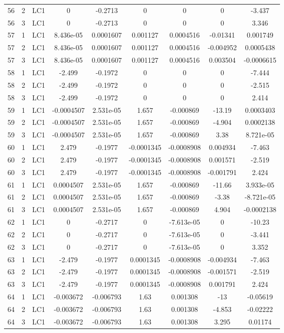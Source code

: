 \documentclass{article}%
\begin{document}
\begin{longtable}{| c c c | c c c c c c |}
56&2&LC1&0&{-}0.2713&0&0&0&{-}3.437\\%
56&3&LC1&0&{-}0.2713&0&0&0&3.346\\%
57&1&LC1&8.436e{-}05&0.0001607&0.001127&0.0004516&{-}0.01341&0.001749\\%
57&2&LC1&8.436e{-}05&0.0001607&0.001127&0.0004516&{-}0.004952&0.0005438\\%
57&3&LC1&8.436e{-}05&0.0001607&0.001127&0.0004516&0.003504&{-}0.0006615\\%
58&1&LC1&{-}2.499&{-}0.1972&0&0&0&{-}7.444\\%
58&2&LC1&{-}2.499&{-}0.1972&0&0&0&{-}2.515\\%
58&3&LC1&{-}2.499&{-}0.1972&0&0&0&2.414\\%
59&1&LC1&{-}0.0004507&2.531e{-}05&1.657&{-}0.000869&{-}13.19&0.0003403\\%
59&2&LC1&{-}0.0004507&2.531e{-}05&1.657&{-}0.000869&{-}4.904&0.0002138\\%
59&3&LC1&{-}0.0004507&2.531e{-}05&1.657&{-}0.000869&3.38&8.721e{-}05\\%
60&1&LC1&2.479&{-}0.1977&{-}0.0001345&{-}0.0008908&0.004934&{-}7.463\\%
60&2&LC1&2.479&{-}0.1977&{-}0.0001345&{-}0.0008908&0.001571&{-}2.519\\%
60&3&LC1&2.479&{-}0.1977&{-}0.0001345&{-}0.0008908&{-}0.001791&2.424\\%
61&1&LC1&0.0004507&2.531e{-}05&1.657&{-}0.000869&{-}11.66&3.933e{-}05\\%
61&2&LC1&0.0004507&2.531e{-}05&1.657&{-}0.000869&{-}3.38&{-}8.721e{-}05\\%
61&3&LC1&0.0004507&2.531e{-}05&1.657&{-}0.000869&4.904&{-}0.0002138\\%
62&1&LC1&0&{-}0.2717&0&{-}7.613e{-}05&0&{-}10.23\\%
62&2&LC1&0&{-}0.2717&0&{-}7.613e{-}05&0&{-}3.441\\%
62&3&LC1&0&{-}0.2717&0&{-}7.613e{-}05&0&3.352\\%
63&1&LC1&{-}2.479&{-}0.1977&0.0001345&{-}0.0008908&{-}0.004934&{-}7.463\\%
63&2&LC1&{-}2.479&{-}0.1977&0.0001345&{-}0.0008908&{-}0.001571&{-}2.519\\%
63&3&LC1&{-}2.479&{-}0.1977&0.0001345&{-}0.0008908&0.001791&2.424\\%
64&1&LC1&{-}0.003672&{-}0.006793&1.63&0.001308&{-}13&{-}0.05619\\%
64&2&LC1&{-}0.003672&{-}0.006793&1.63&0.001308&{-}4.853&{-}0.02222\\%
64&3&LC1&{-}0.003672&{-}0.006793&1.63&0.001308&3.295&0.01174\\%

\end{longtable}
\end{document}
